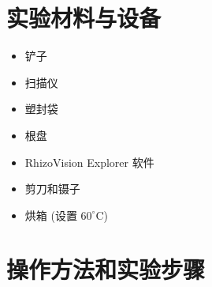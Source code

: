 \documentclass[10.5pt]{config}
\begin{document}
\section{实验材料与设备}

\begin{itemize}
\item 铲子
\item 扫描仪
\item 塑封袋
\item 根盘
\item RhizoVision Explorer 软件
    \item 剪刀和镊子
    \item 烘箱 (设置 $60^\circ\text{C}$)
\end{itemize}


\section{操作方法和实验步骤}
\end{document}
